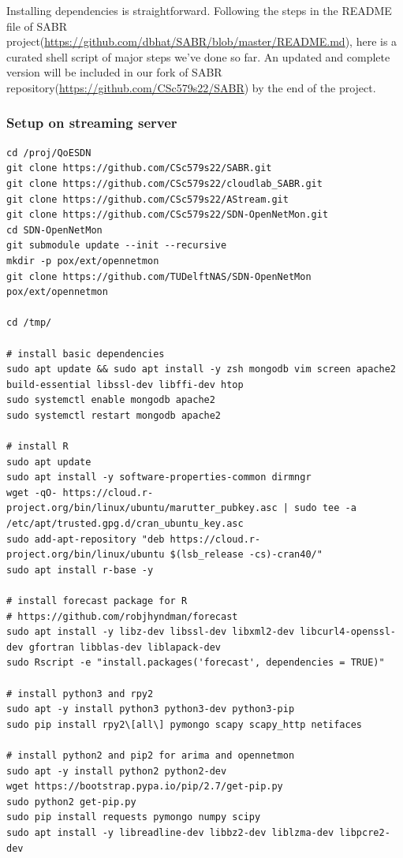 \documentclass{article}
\begin{document}
Installing dependencies is straightforward. Following the steps in the README file of SABR project(\url{https://github.com/dbhat/SABR/blob/master/README.md}), here is a curated shell script of major steps we've done so far. An updated and complete version will be included in our fork of SABR repository(\url{https://github.com/CSc579s22/SABR}) by the end of the project. 

\subsubsection{Setup on streaming server}

\begin{verbatim}
cd /proj/QoESDN
git clone https://github.com/CSc579s22/SABR.git
git clone https://github.com/CSc579s22/cloudlab_SABR.git
git clone https://github.com/CSc579s22/AStream.git
git clone https://github.com/CSc579s22/SDN-OpenNetMon.git
cd SDN-OpenNetMon
git submodule update --init --recursive
mkdir -p pox/ext/opennetmon
git clone https://github.com/TUDelftNAS/SDN-OpenNetMon pox/ext/opennetmon

cd /tmp/

# install basic dependencies
sudo apt update && sudo apt install -y zsh mongodb vim screen apache2 build-essential libssl-dev libffi-dev htop
sudo systemctl enable mongodb apache2
sudo systemctl restart mongodb apache2

# install R
sudo apt update 
sudo apt install -y software-properties-common dirmngr
wget -qO- https://cloud.r-project.org/bin/linux/ubuntu/marutter_pubkey.asc | sudo tee -a /etc/apt/trusted.gpg.d/cran_ubuntu_key.asc
sudo add-apt-repository "deb https://cloud.r-project.org/bin/linux/ubuntu $(lsb_release -cs)-cran40/"
sudo apt install r-base -y

# install forecast package for R
# https://github.com/robjhyndman/forecast
sudo apt install -y libz-dev libssl-dev libxml2-dev libcurl4-openssl-dev gfortran libblas-dev liblapack-dev
sudo Rscript -e "install.packages('forecast', dependencies = TRUE)"

# install python3 and rpy2
sudo apt -y install python3 python3-dev python3-pip
sudo pip install rpy2\[all\] pymongo scapy scapy_http netifaces

# install python2 and pip2 for arima and opennetmon
sudo apt -y install python2 python2-dev 
wget https://bootstrap.pypa.io/pip/2.7/get-pip.py
sudo python2 get-pip.py
sudo pip install requests pymongo numpy scipy 
sudo apt install -y libreadline-dev libbz2-dev liblzma-dev libpcre2-dev


\end{verbatim}
\end{document}
